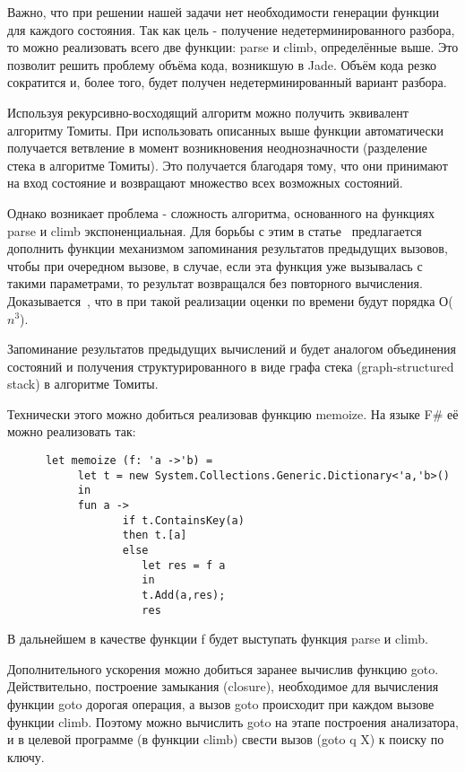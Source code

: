 Важно, что при решении нашей задачи нет необходимости генерации функции для каждого состояния. Так как цель - получение недетерминированного разбора, то можно реализовать всего две функции: parse и climb, определённые выше. Это позволит решить проблему объёма кода, возникшую в Jade. Объём кода резко сократится и, более того, будет получен недетерминированный вариант разбора.  

Используя рекурсивно-восходящий алгоритм можно получить эквивалент  алгоритму Томиты. При  использовать описанных выше функции автоматически получается ветвление в момент возникновения неоднозначности (разделение стека в алгоритме Томиты). Это получается благодаря тому, что они принимают на вход состояние и возвращают множество всех возможных состояний. 

Однако возникает проблема - сложность алгоритма, основанного на функциях parse и climb экспоненциальная. Для борьбы с этим в статье~\cite{Non-det-rec-asc} предлагается дополнить функции  механизмом запоминания результатов предыдущих вызовов, чтобы при очередном вызове, в случае, если эта функция уже вызывалась с такими параметрами, то результат возвращался без повторного вычисления. Доказывается~\cite{Non-det-rec-asc}, что в при такой реализации оценки по времени будут порядка О($n^{3}$).

Запоминание результатов предыдущих вычислений и будет аналогом объединения состояний и получения структурированного в виде графа стека (graph-structured stack) в алгоритме Томиты.

Технически этого можно добиться реализовав функцию memoize. На языке F\# её можно   реализовать так:
\begin{verbatim}
      let memoize (f: 'a ->'b) =
           let t = new System.Collections.Generic.Dictionary<'a,'b>() 
           in
           fun a ->    
                  if t.ContainsKey(a)
                  then t.[a]
                  else 
                     let res = f a 
                     in
                     t.Add(a,res);
                     res 
\end{verbatim}

В дальнейшем в качестве функции f будет выступать функция parse и climb.     

Дополнительного ускорения можно добиться заранее вычислив функцию goto. Действительно, построение замыкания (closure), необходимое для вычисления функции goto дорогая операция, а вызов goto происходит при каждом вызове функции climb. Поэтому можно вычислить goto на этапе построения анализатора, и в целевой программе (в функции climb) свести вызов (goto q X) к поиску по ключу.

